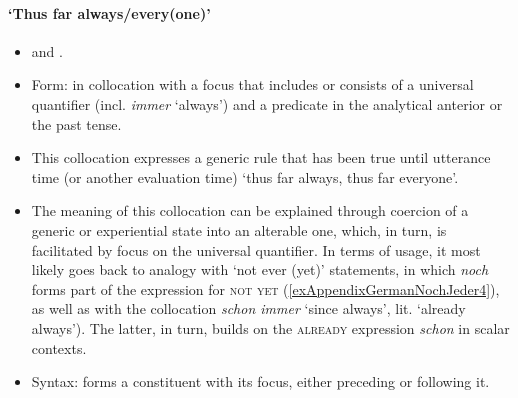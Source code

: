 \paragraph{\lq Thus far always/every(one)\rq{}}\label{appendixGermanNochJeder}
\begin{itemize}
	\item \textcite[172–173]{KoenigEtAl1993} and \textcite[628]{MetrichFaucher2009}.
	\item Form: in collocation with a focus that includes or consists of a universal quantifier (incl. \textit{immer} \lq always\rq{}) and a predicate in the analytical anterior or the past tense.
	\item This collocation expresses a generic rule that has been true until utterance time (or another evaluation time) \lq thus far always, thus far everyone\rq{}.
	\item The meaning of this collocation can be explained through coercion of a generic or experiential state into an alterable one, which, in turn, is facilitated by focus on the universal quantifier. In terms of usage, it most likely goes back to analogy with \lq not ever (yet)\rq{ }statements, in which \textit{noch} forms part of the expression for \textsc{not yet} (\ref{exAppendixGermanNochJeder4}), as well as with the collocation \textit{schon immer} \lq since always\rq{}, lit. \lq{}already always\rq{}). The latter, in turn, builds on the \textsc{already} expression \textit{schon} in scalar contexts.
	\item Syntax: forms a constituent with its focus, either preceding or following it.
\end{itemize}

